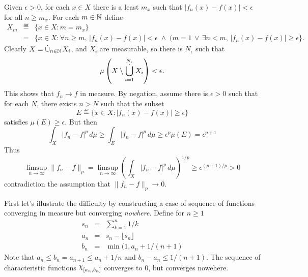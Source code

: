 \begin{enumerate}
\begin{itemize}
 Given \(\epsilon>0\), for each \(x\in X\) there is a least $m_x$
 such that \(|f_n(x) - f(x)| < \epsilon\) for all \(n \geq m_x\).
 For each \(m\in\mathbb{N}\) define
 \begin{eqnarray*}
   X_m
    &\eqdef& \{x\in X: m = m_x\} \\
    &=& \{x\in X: \forall n\geq m,\, |f_n(x) - f(x)| < \epsilon
        \; \wedge\; (m=1 \,\vee\, \exists n<m,\,  |f_n(x) - f(x)| \geq \epsilon
       \}.
 \end{eqnarray*}
 Clearly \(X=\disjunion_{n\in\N}X_i\), and \(X_i\) are measurable,
 so there is \(N_\epsilon\)  such that
 \begin{equation*}
 \mu\left(X\setminus \Disjunion_{i=1}^{N_\epsilon} X_i\right) < \epsilon.
 \end{equation*}
 This shows that \(f_n\to f\) in measure.
 By negation, assume there is \(\epsilon>0\)
 such that for each $N$, there exists \(n>N\)
 such that the subset
 \begin{equation*}
    E \eqdef \{x\in X: |f_n(x) - f(x)| \geq \epsilon\}
 \end{equation*}
 satisfies \(\mu(E) \geq \epsilon\).
 But then
 \begin{equation*}
   \int_X |f_n - f|^p\,d\mu
   \geq \int_E |f_n - f|^p\,d\mu
   \geq \epsilon^p\mu(E) = \epsilon^{p+1}
 \end{equation*}
 Thus
 \begin{equation*}
 \limsup_{n\to\infty} \|f_n-f\|_p =
 \limsup_{n\to\infty} \left(\int_X |f_n - f|^p\,d\mu\right)^{1/p}
 \geq \epsilon^{(p+1)/p} > 0
 \end{equation*}
 contradiction the assumption that \(\|f_n - f\|_p \to 0\).

 First let's illustrate the difficulty by constructing a case
 of sequence of functions converging in measure but converging \emph{nowhere}.
 Define for \(n\geq 1\)
 \begin{eqnarray*}
   s_n &=& \sum_{k=1}^n 1/k \\
   a_n &=& s_n - \lfloor s_n \rfloor \\
   b_n &=& \min(1, a_n + 1/(n+1)
 \end{eqnarray*}
 Note that \(a_n \leq b_n = a_{n+1} \leq a_n + 1/n\)
 and \(b_n - a_n \leq 1/(n+1)\).
 The sequence of characteristic functions  \(\chhi_{[a_n,b_n]}\) converges
 to $0$, but converges nowehere.


\end{itemize}
\end{enumerate}
